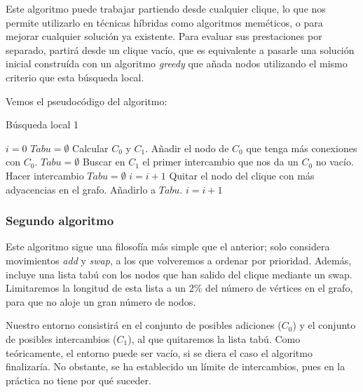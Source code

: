 Este algoritmo puede trabajar partiendo desde cualquier clique, lo que nos permite utilizarlo en técnicas
híbridas como algoritmos meméticos, o para mejorar cualquier solución ya existente. Para evaluar
sus prestaciones por separado, partirá desde un clique vacío, que es equivalente a pasarle una solución
inicial construída con un algoritmo \textit{greedy} que añada nodos utilizando el mismo criterio que esta
búsqueda local.

Vemos el pseudocódigo del algoritmo:

\begin{algorithm}[H]
\caption{Búsqueda local 1}
  \begin{algorithmic}
    \State $i = 0$
    \State $Tabu = \emptyset$
    \State Calcular $C_0$ y $C_1$.
    \Repeat
        \State Añadir el nodo de $C_0$ que tenga más conexiones con $C_0$.
        \State $Tabu = \emptyset$
      \Else
        \State Buscar en $C_1$ el primer intercambio que nos da un $C_0$ no vacío.
          \State Hacer intercambio
          \State $Tabu = \emptyset$
          \State $i = i + 1$
        \Else
          \State Quitar el nodo del clique con más adyacencias en el grafo.
          \State Añadirlo a $Tabu$.
          \State $i = i + 1$
        \EndIf
      \EndIf
  \end{algorithmic}
\end{algorithm}

\subsubsection{Segundo algoritmo}

Este algoritmo sigue una filosofía más simple que el anterior; solo considera movimientos
\textit{add} y \textit{swap}, a los que volveremos a ordenar por prioridad. Además, incluye una
lista tabú con los nodos que han salido del clique mediante un swap. Limitaremos la longitud de
esta lista a un 2\% del número de vértices en el grafo, para que no aloje un gran número de nodos.

Nuestro entorno consistirá en el conjunto de posibles adiciones ($C_0$) y el conjunto de
posibles intercambios ($C_1$), al que quitaremos la lista tabú. Como teóricamente, el entorno
puede ser vacío, si se diera el caso el algoritmo finalizaría. No obstante, se ha establecido un
límite de intercambios, pues en la práctica no tiene por qué suceder.

